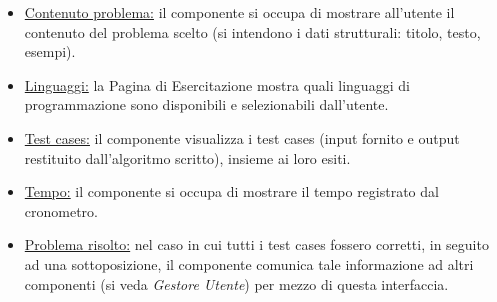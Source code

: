 \documentclass[11pt, a4paper]{article}
\theoremstyle{definition} %
\begin{document}
\begin{description}
\begin{itemize}
        \item \underline{Contenuto problema:} il componente si occupa di mostrare
        all'utente il contenuto del problema scelto (si intendono i dati strutturali:
        titolo, testo, esempi).

        \item \underline{Linguaggi:} la Pagina di Esercitazione mostra quali
        linguaggi di programmazione sono disponibili e selezionabili dall'utente.

        \item \underline{Test cases:} il componente visualizza i test cases
        (input fornito e output restituito dall'algoritmo scritto), insieme ai
        loro esiti.

        \item \underline{Tempo:} il componente si occupa di mostrare il tempo
        registrato dal cronometro.

        \item \underline{Problema risolto:} nel caso in cui tutti i test cases
        fossero corretti, in seguito ad una sottoposizione, il componente comunica
        tale informazione ad altri componenti (si veda \textit{Gestore Utente}) per
        mezzo di questa interfaccia.
    \end{itemize}
\end{description}

\end{document}
